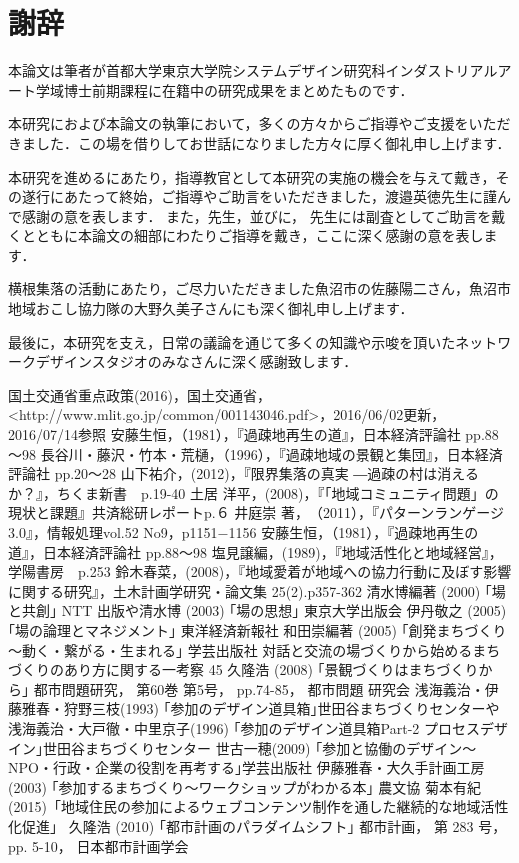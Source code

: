 \documentclass[a4paper]{jsarticle}
\begin{document}
\section*{謝辞}
\par
本論文は筆者が首都大学東京大学院システムデザイン研究科インダストリアルアート学域博士前期課程に在籍中の研究成果をまとめたものです．
\par
本研究におよび本論文の執筆において，多くの方々からご指導やご支援をいただきました．この場を借りしてお世話になりました方々に厚く御礼申し上げます．
\par
本研究を進めるにあたり，指導教官として本研究の実施の機会を与えて戴き，その遂行にあたって終始，ご指導やご助言をいただきました，渡邉英徳先生に謹んで感謝の意を表します．
また，先生，並びに， 先生には副査としてご助言を戴くとともに本論文の細部にわたりご指導を戴き，ここに深く感謝の意を表します．
\par
横根集落の活動にあたり，ご尽力いただきました魚沼市の佐藤陽二さん，魚沼市地域おこし協力隊の大野久美子さんにも深く御礼申し上げます．
\par
最後に，本研究を支え，日常の議論を通じて多くの知識や示唆を頂いたネットワークデザインスタジオのみなさんに深く感謝致します．
\newpage
\begin{thebibliography}{999}

国土交通省重点政策(2016)，国土交通省，<http://www.mlit.go.jp/common/001143046.pdf>，2016/06/02更新，2016/07/14参照
安藤生恒，（1981），『過疎地再生の道』，日本経済評論社 pp.88～98
長谷川・藤沢・竹本・荒樋，（1996），『過疎地域の景観と集団』，日本経済評論社 pp.20～28
山下祐介，(2012)，『限界集落の真実 ―過疎の村は消えるか？』，ちくま新書　p.19-40
土居 洋平，(2008)，『｢地域コミュニティ問題」の現状と課題』共済総研レポートp.６
井庭崇 著，‎（2011），『パターンランゲージ 3.0』，情報処理vol.52 No9，p1151−1156
安藤生恒，（1981），『過疎地再生の道』，日本経済評論社 pp.88～98
塩見譲編，(1989)，『地域活性化と地域経営』，学陽書房　p.253
鈴木春菜，(2008)，『地域愛着が地域への協力行動に及ぼす影響に関する研究』，土木計画学研究・論文集 25(2).p357-362
清水博編著 (2000) ｢場と共創｣ NTT 出版や清水博 (2003) ｢場の思想｣ 東京大学出版会
伊丹敬之 (2005) ｢場の論理とマネジメント｣ 東洋経済新報社
和田崇編著 (2005) ｢創発まちづくり～動く・繋がる・生まれる｣ 学芸出版社 対話と交流の場づくりから始めるまちづくりのあり方に関する一考察 45
久隆浩 (2008) ｢景観づくりはまちづくりから｣ 都市問題研究， 第60巻 第5号， pp.74-85， 都市問題 研究会
浅海義治・伊藤雅春・狩野三枝(1993) ｢参加のデザイン道具箱｣世田谷まちづくりセンターや浅海義治・大戸徹・中里京子(1996) ｢参加のデザイン道具箱Part-2 プロセスデザイン｣世田谷まちづくりセンター
世古一穂(2009) ｢参加と協働のデザイン～NPO・行政・企業の役割を再考する｣学芸出版社
伊藤雅春・大久手計画工房 (2003) ｢参加するまちづくり～ワークショップがわかる本｣ 農文協
菊本有紀(2015)「地域住民の参加によるウェブコンテンツ制作を通した継続的な地域活性化促進」
久隆浩 (2010) ｢都市計画のパラダイムシフト｣ 都市計画， 第 283 号， pp. 5-10， 日本都市計画学会


\end{thebibliography}

\newpage
\end{document}
